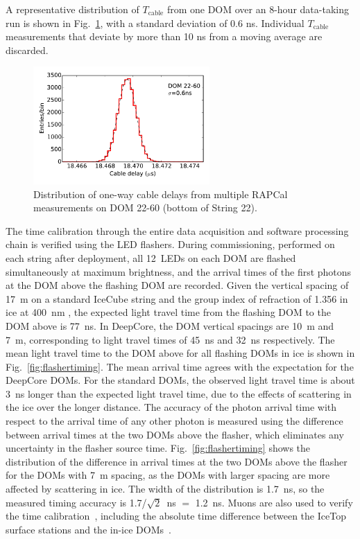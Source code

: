 \noindent A representative distribution of $T_{\mathrm{cable}}$ from one DOM over an 8-hour
data-taking run is shown in Fig.~\ref{fig:rapcal_cable_len}, with a
standard deviation of 0.6 ns.  Individual $T_{\mathrm{cable}}$
measurements that deviate by more than 10 ns from a moving average are discarded.

\begin{figure}[!h]
 \centering
 \includegraphics[width=0.6\textwidth]{graphics/dom/rapcal/tcal_hist_22-60.pdf}
 \caption{Distribution of one-way cable delays from multiple RAPCal
   measurements on DOM 22-60 (bottom of String 22).}
 \label{fig:rapcal_cable_len}
\end{figure}

The time calibration through the entire data acquisition and software
processing chain is verified using the LED flashers. During
commissioning, performed on each string after deployment, all 12~LEDs on
each DOM are flashed simultaneously at 
maximum brightness, and the arrival times of the first photons at the DOM above the flashing DOM
are recorded. Given the vertical spacing of 17~m on a standard IceCube
string and the group index of
refraction of  1.356 in ice at 400~nm \cite{price_woschnagg_ice}, the expected light travel time
from the flashing DOM to the DOM above is 77~ns. In DeepCore, the DOM
vertical spacings are 10~m and 7~m, corresponding to light travel
times of 45~ns and 32~ns respectively. The mean light travel
time to the DOM above for all flashing DOMs in ice is shown in
Fig.~\ref{fig:flashertiming}. The mean arrival time agrees with the
expectation for the DeepCore DOMs. For the standard DOMs, the observed
light travel time is about 3~ns longer than the expected light travel
time, due to the effects of scattering in the ice over the longer
distance. The accuracy of the photon arrival time with respect to the
arrival time of any other photon is measured using
the difference between arrival times at the two DOMs above the
flasher, which eliminates any uncertainty in the flasher source
time. Fig.~\ref{fig:flashertiming} shows the distribution of the
difference in arrival times at the two DOMs above the flasher for the
DOMs with 7~m spacing, as the DOMs with larger spacing are more
affected by scattering in ice. The width of the distribution is
1.7~ns, so the measured timing accuracy is 1.7/$\sqrt{2}$~ns $=$ 1.2~ns. Muons are also used to
verify the time calibration~\cite{ICECUBE:DAQ}, including the absolute time difference
between the IceTop surface stations and the in-ice DOMs~\cite{IC3:perf}.

